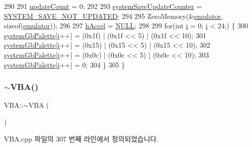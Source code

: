 \begin{DoxyCode}
290   
291   \mbox{\hyperlink{class_v_b_a_a61d96a23607a428ad97f74f4b750fcc2}{updateCount}} = 0;
292 
293   \mbox{\hyperlink{_v_b_a_8cpp_a2f706b3379eaffa6beb045c711a2102c}{systemSaveUpdateCounter}} = \mbox{\hyperlink{_system_8h_a84a7ba498ccb75cd12b84b881d4d2db3}{SYSTEM\_SAVE\_NOT\_UPDATED}};
294 
295   ZeroMemory(&\mbox{\hyperlink{class_v_b_a_ab40fc008c6714c3c8670eb8a9085a4a1}{emulator}}, \textcolor{keyword}{sizeof}(\mbox{\hyperlink{class_v_b_a_ab40fc008c6714c3c8670eb8a9085a4a1}{emulator}}));
296 
297   \mbox{\hyperlink{class_v_b_a_a6ca8052bfc1574a9ef8ca4482563e1e3}{hAccel}} = \mbox{\hyperlink{getopt1_8c_a070d2ce7b6bb7e5c05602aa8c308d0c4}{NULL}};
298 
299   \textcolor{keywordflow}{for}(\textcolor{keywordtype}{int} \mbox{\hyperlink{expr-lex_8cpp_acb559820d9ca11295b4500f179ef6392}{i}} = 0; \mbox{\hyperlink{expr-lex_8cpp_acb559820d9ca11295b4500f179ef6392}{i}} < 24;) \{
300     \mbox{\hyperlink{_v_b_a_8cpp_a0ba4f8654ea47591cc8a66df33d6d3c9}{systemGbPalette}}[\mbox{\hyperlink{expr-lex_8cpp_acb559820d9ca11295b4500f179ef6392}{i}}++] = (0x1f) | (0x1f << 5) | (0x1f << 10);
301     \mbox{\hyperlink{_v_b_a_8cpp_a0ba4f8654ea47591cc8a66df33d6d3c9}{systemGbPalette}}[\mbox{\hyperlink{expr-lex_8cpp_acb559820d9ca11295b4500f179ef6392}{i}}++] = (0x15) | (0x15 << 5) | (0x15 << 10);
302     \mbox{\hyperlink{_v_b_a_8cpp_a0ba4f8654ea47591cc8a66df33d6d3c9}{systemGbPalette}}[\mbox{\hyperlink{expr-lex_8cpp_acb559820d9ca11295b4500f179ef6392}{i}}++] = (0x0c) | (0x0c << 5) | (0x0c << 10);
303     \mbox{\hyperlink{_v_b_a_8cpp_a0ba4f8654ea47591cc8a66df33d6d3c9}{systemGbPalette}}[\mbox{\hyperlink{expr-lex_8cpp_acb559820d9ca11295b4500f179ef6392}{i}}++] = 0;
304   \}
305 \}
\end{DoxyCode}
\mbox{\label{class_v_b_a_a601b4d3c159fde6e6232749e47af58b1}} 
\subsubsection{\texorpdfstring{$\sim$\+V\+B\+A()}{~VBA()}}
{\footnotesize\ttfamily V\+B\+A\+::$\sim$\+V\+BA (\begin{DoxyParamCaption}{ }\end{DoxyParamCaption})}



V\+B\+A.\+cpp 파일의 307 번째 라인에서 정의되었습니다.


